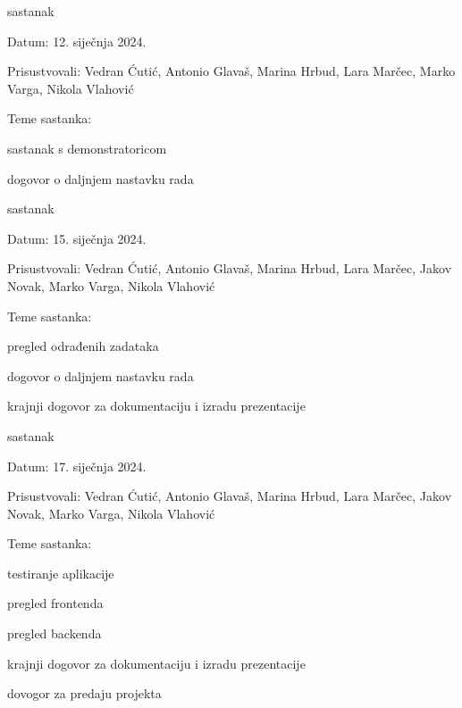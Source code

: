 \begin{packed_enum}
			\item  sastanak
			\item[] \begin{packed_item}
						\item Datum: 12. siječnja 2024.
						\item Prisustvovali: Vedran Ćutić, Antonio Glavaš, Marina Hrbud, Lara Marčec, Marko Varga, Nikola Vlahović
						\item Teme sastanka:
						\begin{packed_item}
							\item  sastanak s demonstratoricom
							\item  dogovor o daljnjem nastavku rada
						\end{packed_item}
			\end{packed_item}

			\item  sastanak
			\item[] \begin{packed_item}
						\item Datum: 15. siječnja 2024.
						\item Prisustvovali: Vedran Ćutić, Antonio Glavaš, Marina Hrbud, Lara Marčec, Jakov Novak, Marko Varga, Nikola Vlahović
						\item Teme sastanka:
						\begin{packed_item}
							\item  pregled odrađenih zadataka
							\item  dogovor o daljnjem nastavku rada
							\item  krajnji dogovor za dokumentaciju i izradu prezentacije
						\end{packed_item}
			\end{packed_item}
			
			\item  sastanak
			\item[] \begin{packed_item}
						\item Datum: 17. siječnja 2024.
						\item Prisustvovali: Vedran Ćutić, Antonio Glavaš, Marina Hrbud, Lara Marčec, Jakov Novak, Marko Varga, Nikola Vlahović
						\item Teme sastanka:
						\begin{packed_item}
							\item  testiranje aplikacije
							\item  pregled frontenda
							\item  pregled backenda
							\item  krajnji dogovor za dokumentaciju i izradu prezentacije
							\item  dovogor za predaju projekta
						\end{packed_item}
			\end{packed_item}
			
			
		\end{packed_enum}
		

